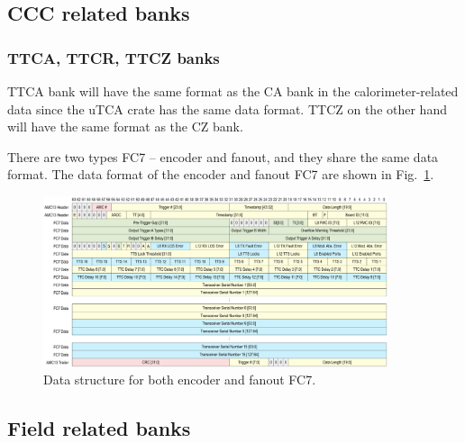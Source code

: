 \subsection{CCC related banks}

\subsubsection*{TTCA, TTCR, TTCZ banks}

TTCA bank will have the same format as the CA bank in the calorimeter-related data since the uTCA crate has the same data format. TTCZ on the other hand will have the same format as the CZ bank.

There are two types FC7 -- encoder and fanout, and they share the same data format. 
The data format of the encoder and fanout FC7 are shown in Fig.~\ref{fig:FC7DataFormat}.



\begin{figure}[htbp]
\centering
\includegraphics[width=0.9\textwidth]{pics/FC7DataFormat20170122.pdf} 
\caption{Data structure for both encoder and fanout FC7.}\label{fig:FC7DataFormat}
\end{figure}

\subsection{Field related banks}

